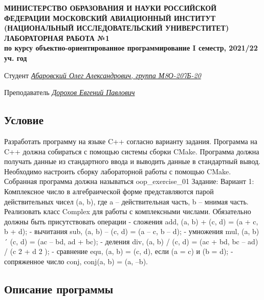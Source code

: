\documentclass[12pt]{article}
\begin{document}
\begin{titlepage}
\begin{center}
\textbf{МИНИСТЕРСТВО ОБРАЗОВАНИЯ И НАУКИ РОССИЙСКОЙ ФЕДЕРАЦИИ
\medskip
МОСКОВСКИЙ АВИАЦИОННЫЙ ИНСТИТУТ
(НАЦИОНАЛЬНЫЙ ИССЛЕДОВАТЕЛЬСКИЙ УНИВЕРСТИТЕТ)
\vfill\vfill
{\Huge ЛАБОРАТОРНАЯ РАБОТА №1} \\
по курсу объектно-ориентированное программирование
I семестр, 2021/22 уч. год}
\end{center}
\vfill

Студент \uline{\it {Абаровский Олег Александрович, группа М8О-207Б-20}\hfill}

Преподаватель \uline{\it {Дорохов Евгений Павлович}\hfill}

\vfill
\end{titlepage}

\subsection*{Условие}

Разработать программу на языке C++ согласно варианту задания. Программа на C++ должна собираться с помощью системы сборки CMake. Программа должна получать данные из стандартного ввода и выводить данные в стандартный вывод. \newline
Необходимо настроить сборку лабораторной работы с помощью CMake. Собранная
программа должна называться oop\_exercise\_01 \newline
Задание: \newline
Вариант 1: Комплексное число в алгебраической форме представляются парой
действительных чисел (a, b), где a – действительная часть, b – мнимая
часть. Реализовать класс Complex для работы с комплексными числами.\newline
Обязательно должны быть присутствовать операции\newline
- сложения add, (a, b) + (c, d) = (a + c, b + d);\newline
- вычитания sub, (a, b) – (c, d) = (a – c, b – d);\newline
- умножения mul, (a, b) ´ (c, d) = (ac – bd, ad + bc);\newline
- деления div, (a, b) / (c, d) = (ac + bd, bc – ad) / (c 2 + d 2 );\newline
- сравнение equ, (a, b) = (c, d), если (a = c) и (b = d);\newline
- сопряженное число conj, conj(a, b) = (a, –b).

\subsection*{Описание программы}
\end{document}
